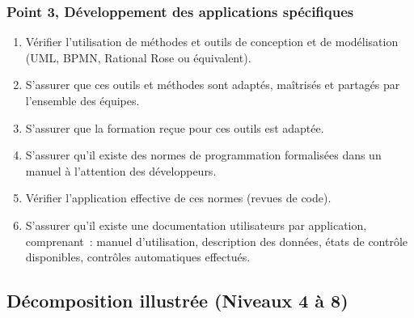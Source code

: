 \subsubsection{Point 3, Développement des applications spécifiques}
\begin{enumerate}[label=3.\arabic*.]
    \item Vérifier l'utilisation de méthodes et outils de conception et de modélisation (UML, BPMN, Rational Rose ou équivalent).
    \item S'assurer que ces outils et méthodes sont adaptés, maîtrisés et partagés par l'ensemble des équipes.
    \item S'assurer que la formation reçue pour ces outils est adaptée.
    \item S'assurer qu'il existe des normes de programmation formalisées dans un manuel à l'attention des développeurs.
    \item Vérifier l'application effective de ces normes (revues de code).
    \item S'assurer qu'il existe une documentation utilisateurs par application, comprenant~: manuel d'utilisation, description des données, états de contrôle disponibles, contrôles automatiques effectués.
\end{enumerate}

\subsection{Décomposition illustrée (Niveaux 4 à 8)}

